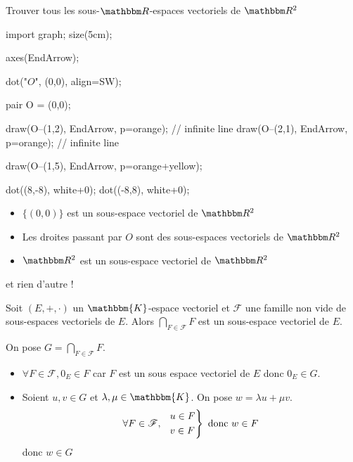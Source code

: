\begin{exo}
	[Exercice]
	Trouver tous les sous-$\R$-espaces vectoriels de $\R^2$ \\
	\begin{center}
		\begin{asy}
			import graph;
			size(5cm);
			
			axes(EndArrow);

			dot("$O$", (0,0), align=SW);

			pair O = (0,0);

			draw(O--(1,2), EndArrow, p=orange); // infinite line 
			draw(O--(2,1), EndArrow, p=orange); // infinite line 

			draw(O--(1,5), EndArrow, p=orange+yellow);

			dot((8,-8), white+0);
			dot((-8,8), white+0);
		\end{asy}
	\end{center}

	\begin{itemize}
		\item $\{(0,0)\}$ est un sous-espace vectoriel de $\R^2$
		\item Les droites passant par $O$ sont des sous-espaces vectoriels de $\R^2$
		\item $\R^2$ est un sous-espace vectoriel de $\R^2$
	\end{itemize}
	et rien d'autre !
\end{exo}

\begin{prop}
	Soit $(E,+,\cdot)$ un $\mathbbm{K}$-espace vectoriel et $\mathcal{F}$ une famille non vide de sous-espaces vectoriels de $E$. Alors $\bigcap_{F \in  \mathcal{F}} F$ est un sous-espace vectoriel de $E$.
\end{prop}

\begin{prv}
	On pose $G = \bigcap_{F \in \mathcal{F}} F$.\\
	\begin{itemize}
		\item $\forall F \in \mathcal{F}, 0_E \in F$ car $F$ est un sous espace vectoriel de $E$ donc $0_E \in G$.
		\item Soient $u,v \in G$ et $\lambda,\mu\in \mathbbm{K}$. On pose $w = \lambda u + \mu v$. \[
			\forall F \in \mathcal{F},~~
			\begin{rcases*}
				u \in F\\
				v \in F
			\end{rcases*} \text{ donc } w \in F
		\] donc $w \in G$
	\end{itemize}
\end{prv}

